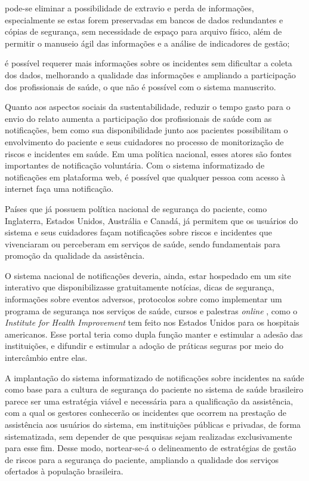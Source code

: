\documentclass{article}
\begin{document}
pode-se eliminar a possibilidade de extravio e perda de informações,
especialmente se
estas forem preservadas em bancos de dados redundantes e cópias de segurança,
sem
necessidade de espaço para arquivo físico, além de permitir o manuseio ágil das
informações e a análise de indicadores de gestão;

é possível requerer mais informações sobre os incidentes sem dificultar a coleta
dos
dados, melhorando a qualidade das informações e ampliando a participação dos
profissionais de saúde, o que não é possível com o sistema manuscrito.

Quanto aos aspectos sociais da sustentabilidade, reduzir o tempo gasto para o
envio do
relato aumenta a participação dos profissionais de saúde com as notificações,
bem como sua
disponibilidade junto aos pacientes possibilitam o envolvimento do paciente e
seus
cuidadores no processo de monitorização de riscos e incidentes em saúde. Em uma
política
nacional, esses atores são fontes importantes de notificação voluntária. Com o
sistema
informatizado de notificações em plataforma web, é possível que qualquer pessoa
com acesso à
internet faça uma notificação.

Países que já possuem política nacional de segurança do paciente, como
Inglaterra, Estados
Unidos, Austrália e Canadá, já permitem que os usuários do sistema e seus
cuidadores façam
notificações sobre riscos e incidentes que vivenciaram ou perceberam em serviços
de saúde,
sendo fundamentais para promoção da qualidade da assistência.

O sistema nacional de notificações deveria, ainda, estar hospedado em um site
interativo
que disponibilizasse gratuitamente notícias, dicas de segurança, informações
sobre eventos
adversos, protocolos sobre como implementar um programa de segurança nos
serviços de saúde,
cursos e palestras \textit{online}
, como o \textit{Institute for Health
Improvement}
tem feito nos Estados Unidos para os hospitais americanos. Esse
portal teria como dupla função manter e estimular a adesão das instituições, e
difundir e
estimular a adoção de práticas seguras por meio do intercâmbio entre elas.

A implantação do sistema informatizado de notificações sobre incidentes na saúde
como base
para a cultura de segurança do paciente no sistema de saúde brasileiro parece
ser uma
estratégia viável e necessária para a qualificação da assistência, com a qual os
gestores
conhecerão os incidentes que ocorrem na prestação de assistência aos usuários do
sistema, em
instituições públicas e privadas, de forma sistematizada, sem depender de que
pesquisas
sejam realizadas exclusivamente para esse fim. Desse modo, nortear-se-á o
delineamento de
estratégias de gestão de riscos para a segurança do paciente, ampliando a
qualidade dos
serviços ofertados à população brasileira.
\end{document}
